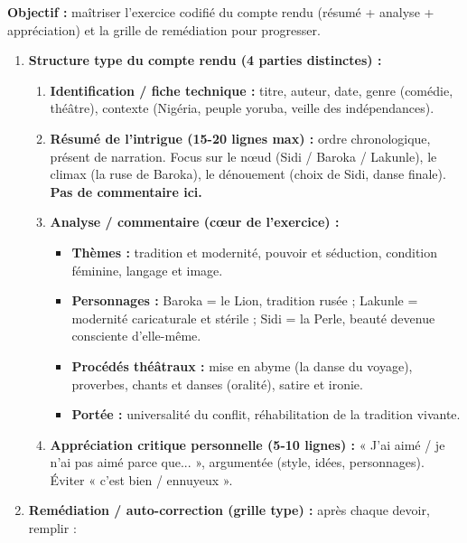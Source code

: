 \documentclass[11pt]{article}
\begin{document}
\begin{methode}
    \textbf{Objectif :} maîtriser l'exercice codifié du compte rendu (résumé + analyse + appréciation) et la grille de remédiation pour progresser.
    \begin{enumerate}
        \item \textbf{Structure type du compte rendu (4 parties distinctes) :}
            \begin{enumerate}
                \item \textbf{Identification / fiche technique :} titre, auteur, date, genre (comédie, théâtre), contexte (Nigéria, peuple yoruba, veille des indépendances).
                \item \textbf{Résumé de l'intrigue (15-20 lignes max) :} ordre chronologique, présent de narration. Focus sur le nœud (Sidi / Baroka / Lakunle), le climax (la ruse de Baroka), le dénouement (choix de Sidi, danse finale). \textbf{Pas de commentaire ici.}
                \item \textbf{Analyse / commentaire (cœur de l'exercice) :}
                    \begin{itemize}
                        \item \textbf{Thèmes :} tradition et modernité, pouvoir et séduction, condition féminine, langage et image.
                        \item \textbf{Personnages :} Baroka = le Lion, tradition rusée ; Lakunle = modernité caricaturale et stérile ; Sidi = la Perle, beauté devenue consciente d'elle-même.
                        \item \textbf{Procédés théâtraux :} mise en abyme (la danse du voyage), proverbes, chants et danses (oralité), satire et ironie.
                        \item \textbf{Portée :} universalité du conflit, réhabilitation de la tradition vivante.
                    \end{itemize}
                \item \textbf{Appréciation critique personnelle (5-10 lignes) :} « J'ai aimé / je n'ai pas aimé parce que... », argumentée (style, idées, personnages). Éviter « c'est bien / ennuyeux ».
            \end{enumerate}
        \item \textbf{Remédiation / auto-correction (grille type) :} après chaque devoir, remplir :
            \begin{center}
            \begin{tabularx}{\linewidth}{|l|X|X|}\hline

\end{tabularx}
\end{center}
\end{enumerate}
\end{methode}
\end{document}
